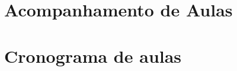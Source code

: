 \begin{anexosenv}
    \chapter{Acompanhamento de Aulas}
    \begin{landscape}
        
    \end{landscape}
    \chapter{Cronograma de aulas}
    	   	
\end{anexosenv}
